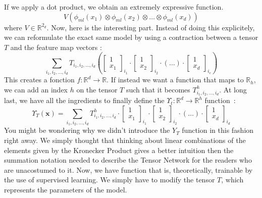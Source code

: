 \documentclass{article}
\theoremstyle{definition}
\theoremstyle{definition}
\begin{document}
If we apply a dot product, we obtain an extremely expressive function.
\[
    V 
    \left(\phi_{ml}(x_1) \otimes \phi_{ml}(x_2)\otimes \dots \otimes \phi_{ml}(x_d) \right)
\]
where $V \in \mathbb{R}^{2_d}$.
Now, here is the interesting part. Instead of doing this explicitely, we can reformulate the exact same model by using a contraction between a tensor $T$ and the feature map vectors : 
\[
    \sum_{i_1, i_2, \dots, i_d} T_{i_1, i_2, \dots, i_d}
    \left(
    \begin{bmatrix}
        1 \\ x_1
    \end{bmatrix}_{i_1}
    \cdot
    \begin{bmatrix}
        1 \\ x_2
    \end{bmatrix}_{i_2}
    \cdot
    (\dots)
    \cdot
    \begin{bmatrix}
        1 \\ x_d
    \end{bmatrix}_{i_e}
    \right)
\]
This creates a fonction $f: \mathbb{R}^d \to \mathbb{R}$. If instead we want a function that maps to $\mathbb{R}_h$, we can add an index $h$ on the tensor $T$ such that it becomes $T^{h}_{i_1, i_2, \dots, i_d}$. At long last, we have all the ingredients to finally define the $\Upsilon_t :  \mathbb{R}^d \to \mathbb{R}^h$ function~:
\[
    \Upsilon_T(\mathbf{x}) =     \sum_{i_1, i_2, \dots, i_d} T^{h}_{i_1, i_2, \dots, i_d}
    \cdot
    \begin{bmatrix}
        1 \\ x_1
    \end{bmatrix}_{i_1}
    \cdot
    \begin{bmatrix}
        1 \\ x_2
    \end{bmatrix}_{i_2}
    \cdot
    (\dots)
    \cdot
    \begin{bmatrix}
        1 \\ x_d
    \end{bmatrix}_{i_d}
\]
You might be wondering why we didn't introduce the $Y_T$ function in this fashion right away. We simply thought that thinking about linear combinations of the elements given by the Kronecker Product gives a better intuition then the summation notation needed to describe the Tensor Network for the readers who are unacostumed to it. Now, we have function that is, theoretically, trainable by the use of supervised learning. We simply have to modify the tensor $T$, which represents the parameters of the model.
\end{document}
